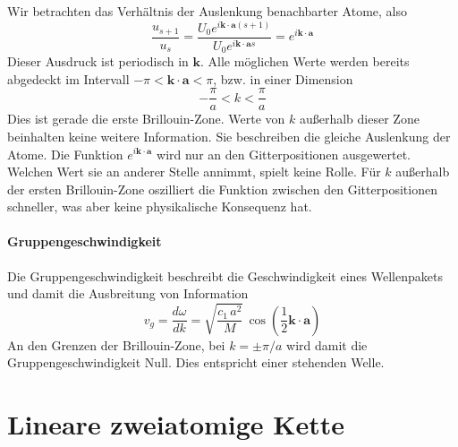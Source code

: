 Wir betrachten das Verhältnis der Auslenkung benachbarter Atome, also
\begin{equation}
 \frac{u_{s+1}}{u_s}  = 
 \frac{U_0 e^{i \mathbf{k} \cdot \mathbf{a} (s+1) } } 
        {U_0 e^{i \mathbf{k} \cdot \mathbf{a} s}} 
         = e^{i \mathbf{k} \cdot \mathbf{a}}
\end{equation}
Dieser Ausdruck ist periodisch in $\mathbf{k}$. Alle möglichen Werte werden bereits abgedeckt im Intervall $- \pi < \mathbf{k} \cdot \mathbf{a}  < \pi$, bzw. in einer Dimension 
 \begin{equation}
 - \frac{\pi}{a} < k <  \frac{\pi}{a}
 \end{equation} 
Dies ist gerade die erste Brillouin-Zone. Werte von $k$ außerhalb dieser Zone beinhalten keine weitere Information. Sie beschreiben die gleiche Auslenkung der Atome. Die Funktion  $e^{i \mathbf{k} \cdot \mathbf{a}}$ wird nur an den Gitterpositionen ausgewertet. Welchen Wert sie an anderer Stelle annimmt, spielt keine Rolle. Für $k$ außerhalb der ersten Brillouin-Zone oszilliert die Funktion zwischen den Gitterpositionen schneller, was aber keine physikalische Konsequenz hat.



\paragraph{Gruppengeschwindigkeit}
Die Gruppengeschwindigkeit beschreibt die Geschwindigkeit eines Wellenpakets und damit die Ausbreitung von Information
\begin{equation}
v_g = \frac{d \omega}{d k} =
 \sqrt{\frac{c_1 \, a^2}{M} } \, \cos 
 \left( \frac{1}{2} \mathbf{k} \cdot \mathbf{a} \right)
\end{equation}
An den Grenzen der Brillouin-Zone, bei $k = \pm \pi / a$ wird damit die Gruppengeschwindigkeit Null. Dies entspricht einer stehenden Welle.






\section{Lineare zweiatomige Kette}

